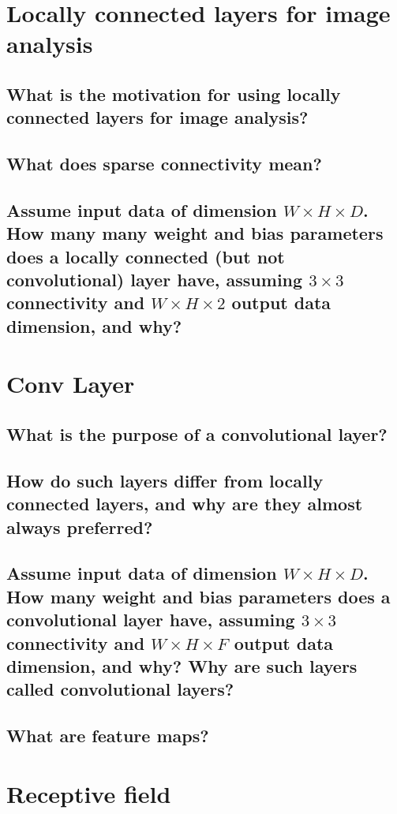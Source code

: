 \section{Locally connected layers for image analysis}
\subsection{What is the motivation for using locally connected layers for image analysis?}
\subsection{What does sparse connectivity mean?}
\subsection{Assume input data of dimension $W \times H \times D$. How many many weight and bias parameters does a locally connected (but not convolutional) layer have, assuming $3 \times 3$ connectivity and $W \times H \times 2$ output data dimension, and why?}

\section{Conv Layer}
\subsection{What is the purpose of a convolutional layer?}
\subsection{How do such layers differ from locally connected layers, and why are they almost always preferred?}
\subsection{Assume input data of dimension $W \times H \times D$. How many weight and bias parameters does a convolutional layer have, assuming $3 \times 3$ connectivity and $W \times H \times  F$ output data dimension, and why? Why are such layers called convolutional layers?}
\subsection{What are feature maps?}

\section{Receptive field}
